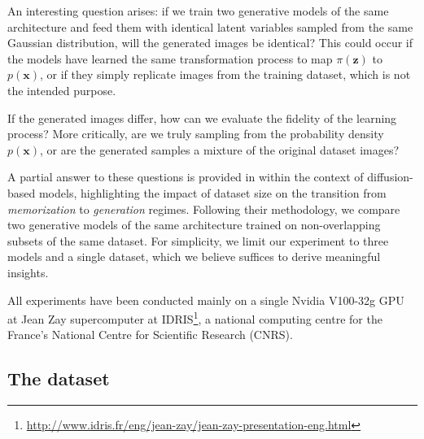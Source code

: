\documentclass[fleqn,usenatbib]{mnras}
\begin{document}
An interesting question arises: if we train two generative models of the same architecture and feed them with identical latent variables sampled from the same Gaussian distribution, will the generated images be identical? This could occur if the models have learned the same transformation process to map $\pi(\bm{z})$ to $p(\bm{x})$, or if they simply replicate images from the training dataset, which is not the intended purpose. 

If the generated images differ, how can we evaluate the fidelity of the learning process? More critically, are we truly sampling from the probability density $p(\bm{x})$, or are the generated samples a mixture of the original dataset images?

A partial answer to these questions is provided in \cite{kadkhodaie2024generalization} within the context of diffusion-based models, highlighting the impact of dataset size on the transition from \textit{memorization} to \textit{generation} regimes. Following their methodology, we compare two generative models of the same architecture trained on non-overlapping subsets of the same dataset. For simplicity, we limit our experiment to three models and a single dataset, which we believe suffices to derive meaningful insights.

All experiments have been conducted mainly on a single Nvidia V100-32g GPU at Jean Zay supercomputer at IDRIS\footnote{\url{http://www.idris.fr/eng/jean-zay/jean-zay-presentation-eng.html}}, a national computing centre for the France's National Centre for Scientific Research (CNRS).
%

\subsection{The dataset}
\label{sec-Dataset}
%
%
\end{document}
